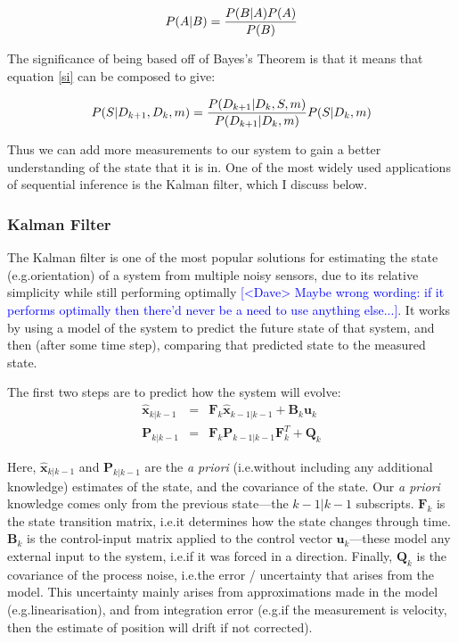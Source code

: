 \documentclass[12pt]{article}
\newcommand{\note}[2][red]{\textcolor{#1}{#2}}
\newcommand{\notedme}[1]{\note[blue]{[<Dave> #1]}}
\begin{document}
\begin{equation}
	P(A | B) = {P(B|A) P(A) \over P(B)}
\end{equation}

The significance of being based off of Bayes's Theorem is that it means that equation \ref{si} can be composed to give:

\begin{equation}
	P(S|D_{k+1},D_k,m) = {P(D_{k+1}|D_k,S,m) \over P(D_{k+1}|D_k,m)} P(S | D_k, m)
\end{equation}

\noindent Thus we can add more measurements to our system to gain a better understanding of the state that it is in. One of the most widely used applications of sequential inference is the Kalman filter, which I discuss below.

\subsubsection{Kalman Filter}

The Kalman filter \cite{kalman_1960} is one of the most popular solutions for estimating the state (e.g.\@ orientation) of a system from multiple noisy sensors, due to its relative simplicity while still performing optimally \cite{wangyan_2015} \notedme{Maybe wrong wording: if it performs optimally then there'd never be a need to use anything else...}. It works by using a model of the system to predict the future state of that system, and then (after some time step), comparing that predicted state to the measured state.

The first two steps are to predict how the system will evolve:
\begin{eqnarray}
	\mathbf{\hat{x}}_{k | k-1} &=& \mathbf{F}_k \mathbf{\hat{x}}_{k-1|k-1} + \mathbf{B}_k \mathbf{u}_k \\
	\mathbf{P}_{k|k-1} &=& \mathbf{F}_k \mathbf{P}_{k-1 | k-1} \mathbf{F}^T_k + \mathbf{Q}_k
\end{eqnarray}

Here, $\mathbf{\hat{x}}_{k | k-1}$ and $\mathbf{P}_{k|k-1}$ are the \emph{a priori} (i.e.\@ without including any additional knowledge) estimates of the state, and the covariance of the state. Our \emph{a priori} knowledge comes only from the previous state---the $k-1|k-1$ subscripts. $\mathbf{F}_k$ is the state transition matrix, i.e.\@ it determines how the state changes through time. $\mathbf{B}_k$ is the control-input matrix applied to the control vector $\mathbf{u}_k$---these model any external input to the system, i.e.\@ if it was forced in a direction. Finally, $\mathbf{Q}_k$ is the covariance of the process noise, i.e.\@ the error / uncertainty that arises from the model. This uncertainty mainly arises from approximations made in the model (e.g.\@ linearisation), and from integration error (e.g.\@ if the measurement is velocity, then the estimate of position will drift if not corrected).
\end{document}
